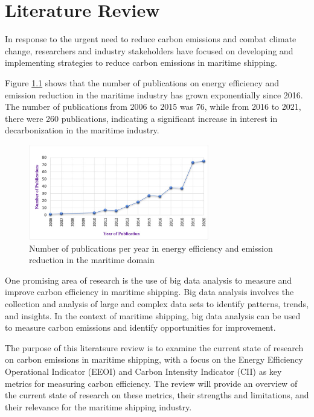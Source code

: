\chapter{Literature Review}

In response to the urgent need to reduce carbon emissions and combat climate change, researchers and industry stakeholders have focused on developing and implementing strategies to reduce carbon emissions in maritime shipping.

Figure \ref{publicationRate} shows that the number of publications on energy efficiency and emission reduction in the maritime industry has grown exponentially since 2016. The number of publications from 2006 to 2015 was 76, while from 2016 to 2021, there were 260 publications, indicating a significant increase in interest in decarbonization in the maritime industry.
\autocite{JIMENEZ2022132888}

\begin{figure}[h]
    \centering
    \includegraphics[width=0.7\textwidth]{images/publication_rate.jpg}
    \caption{Number of publications per year in energy efficiency and emission reduction in the maritime domain}
    \label{publicationRate}
\end{figure}

One promising area of research is the use of big data analysis to measure and improve carbon efficiency in maritime shipping. Big data analysis involves the collection and analysis of large and complex data sets to identify patterns, trends, and insights. In the context of maritime shipping, big data analysis can be used to measure carbon emissions and identify opportunities for improvement.

The purpose of this literatsure review is to examine the current state of research on carbon emissions in maritime shipping, with a focus on the Energy Efficiency Operational Indicator (EEOI) and Carbon Intensity Indicator (CII) as key metrics for measuring carbon efficiency. The review will provide an overview of the current state of research on these metrics, their strengths and limitations, and their relevance for the maritime shipping industry.

